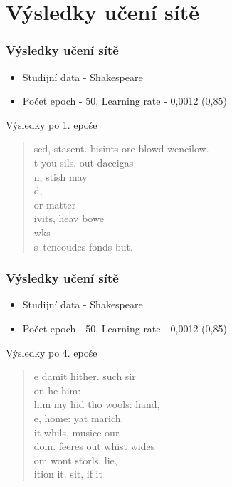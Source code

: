 \documentclass{beamer}
\begin{document}


	\section{Výsledky učení sítě}
	\begin{frame}
	\frametitle{Výsledky učení sítě}
		\begin{itemize}
			\item Studijní data - Shakespeare
			\item Počet epoch - 50, Learning rate - 0,0012 (0,85)
		\end{itemize}
		\begin{block}{Výsledky po 1. epoše}
			\begin{quote}
				sed, stasent. bisints ore blowd wencilow.\\
				t you sils. out daceigas\\
				n, stish may\\
				d,\\
				or matter\\
				ivits, heav bowe\\
				wks\\
				s~tencoudes fonds but.\\
			\end{quote}
		\end{block}
	\end{frame}

	\begin{frame}
	\frametitle{Výsledky učení sítě}
		\begin{itemize}
			\item Studijní data - Shakespeare
			\item Počet epoch - 50, Learning rate - 0,0012 (0,85)
		\end{itemize}
		\begin{block}{Výsledky po 4. epoše}
			\begin{quote}
				e damit hither. such sir\\
				on he him:\\
				him my hid tho wools: hand,\\
				e, home: yat marich.\\
				it whils, musice our\\
				dom. feeres out whist wides\\
				om wont storls, lie,\\
				ition it. sit, if it\\
			\end{quote}
		\end{block}
	\end{frame}
\end{document}
